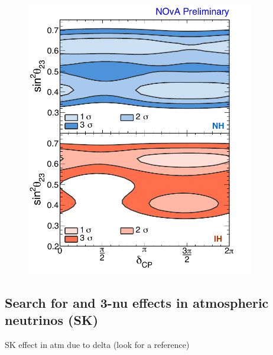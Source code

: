 \begin{figure} [h!]
\begin{center}
\includegraphics[width=10cm]{figures/nova_dcp.pdf}
\caption{\label{fig:novadcp}  }
\end{center}
\end{figure}



\subsection{ Search for \dcp and 3-nu effects in atmospheric neutrinos (SK)}
SK effect in atm due to delta
(look for a reference)